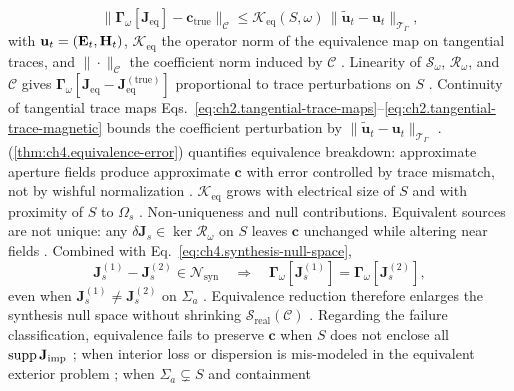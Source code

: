 \begin{equation}
\label{eq:ch4.equivalence-coefficient-error}
\big\|\boldsymbol{\Gamma}_\omega[\mathbf{J}_{\mathrm{eq}}]-\mathbf{c}_{\mathrm{true}}\big\|_{\mathcal{C}}
\le
\mathcal{K}_{\mathrm{eq}}(S,\omega)\,
\big\|\widetilde{\mathbf{u}}_{t}-\mathbf{u}_{t}\big\|_{\mathcal{T}_\Gamma},
\end{equation}
with \(\mathbf{u}_{t}=(\mathbf{E}_{t},\mathbf{H}_{t})\), \(\mathcal{K}_{\mathrm{eq}}\) the operator norm of the equivalence map
on tangential traces, and \(\|\cdot\|_{\mathcal{C}}\) the coefficient norm induced by \(\mathcal{C}\)
\cite{stratton1941}.
Linearity of \(\mathcal{S}_\omega\), \(\mathcal{R}_\omega\), and \(\mathcal{C}\) gives
\(\boldsymbol{\Gamma}_\omega[\mathbf{J}_{\mathrm{eq}}-\mathbf{J}_{\mathrm{eq}}^{\mathrm{(true)}}]\) proportional to
trace perturbations on \(S\) \cite{stratton1941}. Continuity of tangential trace maps
Eqs.~\eqref{eq:ch2.tangential-trace-maps}--\eqref{eq:ch2.tangential-trace-magnetic} bounds the coefficient
perturbation by \(\|\widetilde{\mathbf{u}}_{t}-\mathbf{u}_{t}\|_{\mathcal{T}_\Gamma}\) \cite{stratton1941}.
(\ref{thm:ch4.equivalence-error}) quantifies equivalence breakdown: approximate aperture fields produce
approximate \(\mathbf{c}\) with error controlled by trace mismatch, not by wishful normalization
\cite{devaney2004}. \(\mathcal{K}_{\mathrm{eq}}\) grows with electrical size of \(S\) and with
proximity of \(S\) to \(\Omega_{s}\) \cite{harrington2001}.
Non-uniqueness and null contributions. Equivalent sources are not unique: any \(\delta\mathbf{J}_{s}\in\ker\mathcal{R}_\omega\) on \(S\) leaves
\(\mathbf{c}\) unchanged while altering near fields \cite{stratton1941}. Combined with
Eq.~\eqref{eq:ch4.synthesis-null-space},
\begin{equation}
\label{eq:ch4.equivalence-null-ambiguity}
\mathbf{J}_{s}^{(1)}-\mathbf{J}_{s}^{(2)}\in\mathcal{N}_{\mathrm{syn}}
\quad\Longrightarrow\quad
\boldsymbol{\Gamma}_\omega[\mathbf{J}_{s}^{(1)}]=\boldsymbol{\Gamma}_\omega[\mathbf{J}_{s}^{(2)}],
\end{equation}
even when \(\mathbf{J}_{s}^{(1)}\neq\mathbf{J}_{s}^{(2)}\) on \(\Sigma_{a}\) \cite{devaney2004}. Equivalence
reduction therefore enlarges the synthesis null space without shrinking \(\mathcal{S}_{\mathrm{real}}(\mathcal{C})\)
\cite{harrington2001}.
Regarding the failure classification, equivalence fails to preserve \(\mathbf{c}\) when \(S\) does not enclose all
\(\operatorname{supp}\mathbf{J}_{\mathrm{imp}}\) \cite{stratton1941}; when interior loss or dispersion is mis-modeled in the
equivalent exterior problem \cite{harrington2001}; when \(\Sigma_{a}\subsetneq S\) and containment
